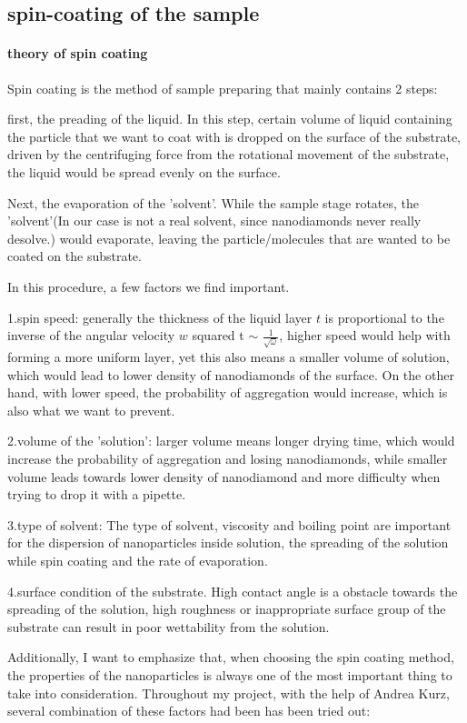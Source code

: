 \subsection{spin-coating of the sample}
\paragraph{theory of spin coating} 
Spin coating is the method of sample preparing that mainly contains 2 steps:

first, the preading of the liquid. In this step, certain volume of liquid containing the particle that we want to coat with is dropped on the surface of the substrate, driven by the centrifuging force from the rotational movement of the substrate, the liquid would be spread evenly on the surface.

Next, the evaporation of the 'solvent'. While the sample stage rotates, the 'solvent'(In our case is not a real solvent, since nanodiamonds never really desolve.) would evaporate, leaving the particle/molecules that are wanted to be coated on the substrate.

In this procedure, a few factors we find important.

1.spin speed: generally the thickness of the liquid layer $t$ is proportional to the inverse of the angular velocity $w$ squared t $\sim$ $\frac{1}{\sqrt{\omega}}$, higher speed would help with forming a more uniform layer, yet this also means a smaller volume of solution, which would lead to lower density of nanodiamonds of the surface. On the other hand, with lower speed, the probability of aggregation would increase, which is also what we want to prevent.

2.volume of the 'solution': larger volume means longer drying time, which would increase the probability of aggregation and losing nanodiamonds, while smaller volume leads towards lower density of nanodiamond and more difficulty when trying to drop it with a pipette. 

3.type of solvent: The type of solvent, viscosity and boiling point are important for the dispersion of nanoparticles inside solution, the spreading of the solution while spin coating and the rate of evaporation.

4.surface condition of the substrate. High contact angle is a obstacle towards the spreading of the solution, high roughness or inappropriate surface group of the substrate can result in poor wettability from the solution.

Additionally, I want to emphasize that, when choosing the spin coating method, the properties of the nanoparticles is always one of the most important thing to take into consideration. 
Throughout my project, with the help of Andrea Kurz, several combination of these factors had been has been tried out:

